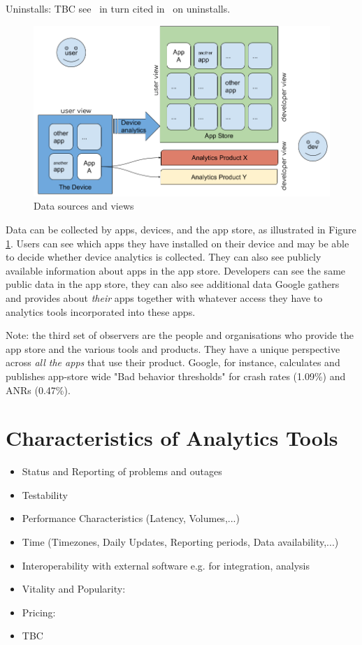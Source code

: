 Uninstalls: TBC see~\cite{bohmer2011falling_asleep_with_angry_birds} in turn cited in~\cite{lim_investigating_country_differences} on uninstalls. %

\begin{figure}[ht]
    \centering
    \includegraphics[width=\textwidth]{images/data_sources_and_views_25_jan_2020.jpg}
    \caption{Data sources and views}
    \label{fig:data_sources_and_views}
\end{figure}

Data can be collected by apps, devices, and the app store, as illustrated in Figure \ref{fig:data_sources_and_views}. Users can see which apps they have installed on their device and may be able to decide whether device analytics is collected. They can also see publicly available information about apps in the app store. Developers can see the same public data in the app store, they can also see additional data Google gathers and provides about \textit{their} apps together with whatever access they have to analytics tools incorporated into these apps.

Note: the third set of observers are the people and organisations who provide the app store and the various tools and products. They have a unique perspective across \textit{all the apps} that use their product. Google, for instance, calculates and publishes app-store wide "Bad behavior thresholds" for crash rates (1.09\%) and ANRs (0.47\%).

\section{Characteristics of Analytics Tools}


\begin{itemize}
    \item Status and Reporting of problems and outages
    \item Testability
    \item Performance Characteristics (Latency, Volumes,...)
    \item Time (Timezones, Daily Updates, Reporting periods, Data availability,...)
    \item Interoperability with external software e.g. for integration, analysis
    \item Vitality and Popularity: 
    \item Pricing:
    \item TBC
\end{itemize}

